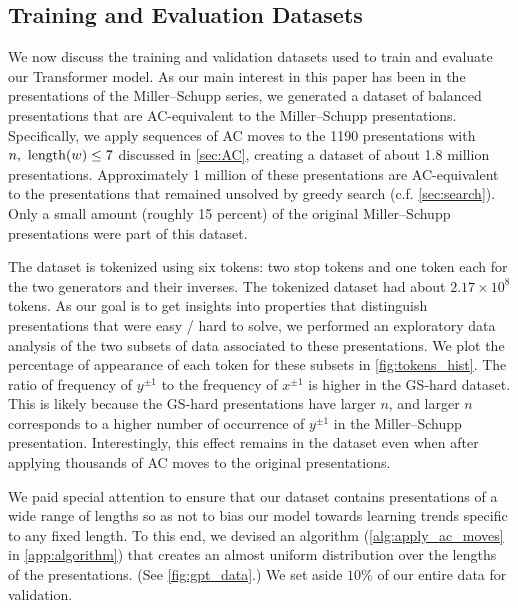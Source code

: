 \subsection{Training and Evaluation Datasets\label{sec:transformer_datasets}}

We now discuss the training and validation datasets used to train and evaluate our Transformer model.
As our main interest in this paper has been in the presentations of the Miller--Schupp series, we generated a dataset of balanced presentations that are AC-equivalent to the Miller--Schupp presentations.
Specifically, we apply sequences of AC moves to the 1190 presentations with $n,\ \length(w) \leq 7$ discussed in \autoref{sec:AC}, creating a dataset of about 1.8 million presentations.
Approximately 1 million of these presentations are AC-equivalent to the presentations that remained unsolved by greedy search (c.f. \autoref{sec:search}).
Only a small amount (roughly 15 percent) of the original Miller--Schupp presentations were part of this dataset.

The dataset is tokenized using six tokens: two stop tokens and one token each for the two generators and their inverses.
The tokenized dataset had about $2.17 \times 10^8$ tokens.
As our goal is to get insights into properties that distinguish presentations that were easy / hard to solve, we performed an exploratory data analysis of the two subsets of data associated to these presentations.
We plot the percentage of appearance of each token for these subsets in \autoref{fig:tokens_hist}.
The ratio of frequency of $y^{\pm 1}$ to the frequency of $x^{\pm 1}$ is higher in the GS-hard dataset.
This is likely because the GS-hard presentations have larger $n$, and larger $n$ corresponds to a higher number of occurrence of $y^{\pm 1}$ in the Miller--Schupp presentation.
Interestingly, this effect remains in the dataset even when after applying thousands of AC moves to the original presentations.

We paid special attention to ensure that our dataset contains presentations of a wide range of lengths so as not to bias our model towards learning trends specific to any fixed length.
To this end, we devised an algorithm (\autoref{alg:apply_ac_moves} in \autoref{app:algorithm}) that creates an almost uniform distribution over the lengths of the presentations.
(See \autoref{fig:gpt_data}.) We set aside $10\%$ of our entire data for validation.

